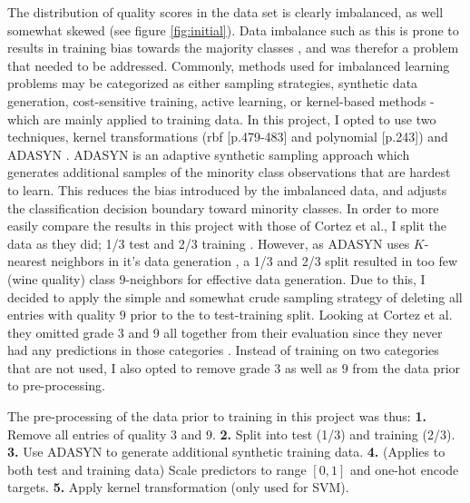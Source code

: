 \documentclass[%
oneside,                 %
final,                   %
10pt]{article}
\begin{document}
The distribution of quality scores in the data set is clearly imbalanced, as well somewhat  skewed (see figure \ref{fig:initial}). Data imbalance such as this is prone to results in training bias towards the majority classes \cite{HaiboHe2008AAss}, and was therefor a problem that needed to be addressed. Commonly, methods used for imbalanced learning problems may be categorized as either sampling strategies, synthetic data generation, cost-sensitive training, active learning, or kernel-based methods \cite{HaiboHe2008AAss} - which are mainly applied to training data. In this project, I opted to use two techniques,  kernel transformations (rbf \citep{MLMurphy}[p.479-483] and polynomial \citep{2002PRwS}[p.243]) and ADASYN \cite{HaiboHe2008AAss}. ADASYN is an adaptive synthetic sampling approach which generates additional samples of the minority class observations that are hardest to learn. This reduces the bias introduced by the imbalanced data, and adjusts the classification decision boundary toward minority classes. In order to more easily compare the results in this project with those of Cortez et al., I split the data as they did; 1/3 test and 2/3 training \citep{CortezPaulo}. However, as ADASYN uses $K$-nearest neighbors in it's data generation  \cite{HaiboHe2008AAss}, a 1/3 and 2/3 split resulted in too few (wine quality) class $9$-neighbors for effective data generation. Due to this, I decided to apply the simple and somewhat crude sampling strategy of deleting all entries with quality $9$ prior to the to test-training split. Looking at Cortez et al. they omitted grade 3 and 9 all together from their evaluation since they never had any predictions in those categories \citep{CortezPaulo}. Instead of training on two categories that are not used, I also opted to remove grade $3$ as well as $9$ from the data prior to pre-processing.  

The pre-processing of the data prior to training in this project was thus: \textbf{1.} Remove all entries of quality $3$ and $9$. \textbf{2.} Split into test (1/3) and training (2/3). \textbf{3.} Use ADASYN to generate additional synthetic training data. \textbf{4.} (Applies to both test and training data) Scale predictors to range $[0,1]$ and one-hot encode targets. \textbf{5.} Apply kernel transformation (only used for SVM).

 
 
\end{document}
